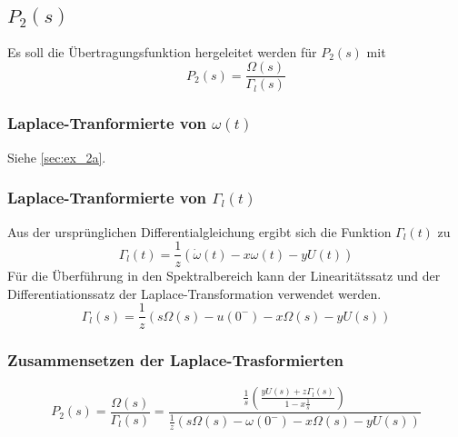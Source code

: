\subsection{$P_2(s)$}
Es soll die Übertragungsfunktion hergeleitet werden für $P_2(s)$ mit
\[
	P_2(s) = \frac{\Omega(s)}{\Gamma_l(s)}
\]

\subsubsection{Laplace-Tranformierte von $\omega(t)$}
Siehe \ref{sec:ex_2a}.

\subsubsection{Laplace-Tranformierte von $\Gamma_l(t)$}
Aus der ursprünglichen Differentialgleichung ergibt sich die Funktion
$\Gamma_l(t)$ zu
\[
	\Gamma_l(t)
	= \frac{1}{z} \left( \dot\omega(t) - x \omega(t) - y U(t) \right)
\]
Für die Überführung in den Spektralbereich kann der Linearitätssatz und der
Differentiationssatz der Laplace-Transformation verwendet werden.
\[
	\Gamma_l(s)
	= \frac{1}{z} \left(
		s \Omega(s)
		- u(0^-)
		- x \Omega(s)
		- y U(s)
	\right)
\]

\subsubsection{Zusammensetzen der Laplace-Trasformierten}
\[
	P_2(s) = \frac{\Omega(s)}{\Gamma_l(s)}
	= \frac{
			\frac{1}{s} \left(
				\frac{y U(s) + z \Gamma_l(s)}{1 - x \frac{1}{s}}
			\right)
		}{
			\frac{1}{z} \left(
				s \Omega(s) - \omega(0^-) - x \Omega(s) - y U(s)
			\right)
		}
\]
